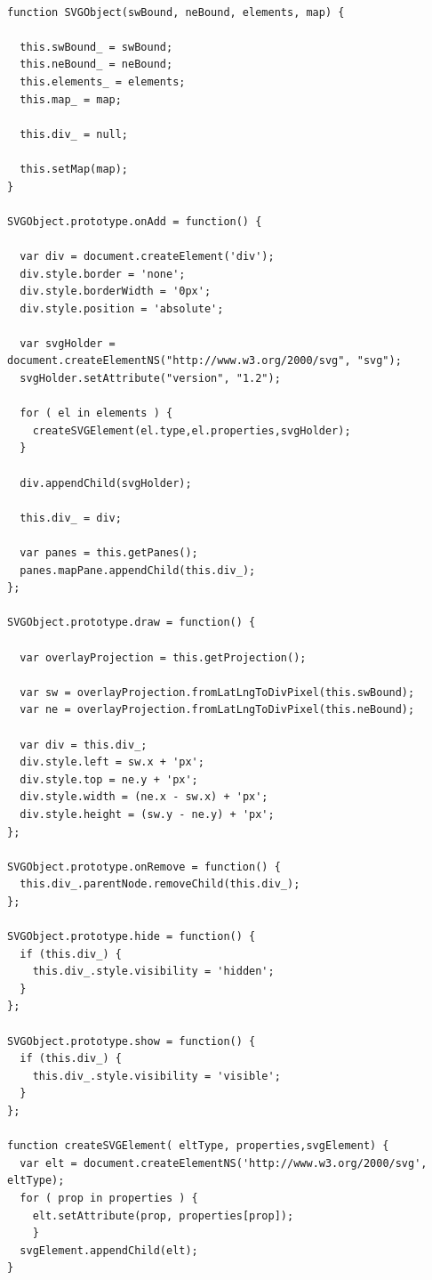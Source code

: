 \lstset{language=JavaScript}
\begin{lstlisting}[label={lst:svgImpl},caption={Klasa do obsługi SVG}]

function SVGObject(swBound, neBound, elements, map) {

  this.swBound_ = swBound;
  this.neBound_ = neBound;
  this.elements_ = elements;
  this.map_ = map;

  this.div_ = null;

  this.setMap(map);
}

SVGObject.prototype.onAdd = function() {

  var div = document.createElement('div');
  div.style.border = 'none';
  div.style.borderWidth = '0px';
  div.style.position = 'absolute';

  var svgHolder = document.createElementNS("http://www.w3.org/2000/svg", "svg");
  svgHolder.setAttribute("version", "1.2");

  for ( el in elements ) {
	createSVGElement(el.type,el.properties,svgHolder);
  }

  div.appendChild(svgHolder);

  this.div_ = div;

  var panes = this.getPanes();
  panes.mapPane.appendChild(this.div_);
};

SVGObject.prototype.draw = function() {

  var overlayProjection = this.getProjection();

  var sw = overlayProjection.fromLatLngToDivPixel(this.swBound);
  var ne = overlayProjection.fromLatLngToDivPixel(this.neBound);

  var div = this.div_;
  div.style.left = sw.x + 'px';
  div.style.top = ne.y + 'px';
  div.style.width = (ne.x - sw.x) + 'px';
  div.style.height = (sw.y - ne.y) + 'px';
};

SVGObject.prototype.onRemove = function() {
  this.div_.parentNode.removeChild(this.div_);
};

SVGObject.prototype.hide = function() {
  if (this.div_) {
    this.div_.style.visibility = 'hidden';
  }
};

SVGObject.prototype.show = function() {
  if (this.div_) {
    this.div_.style.visibility = 'visible';
  }
};

function createSVGElement( eltType, properties,svgElement) {
  var elt = document.createElementNS('http://www.w3.org/2000/svg', eltType);
  for ( prop in properties ) {
    elt.setAttribute(prop, properties[prop]);
    }
  svgElement.appendChild(elt);
}

\end{lstlisting}

